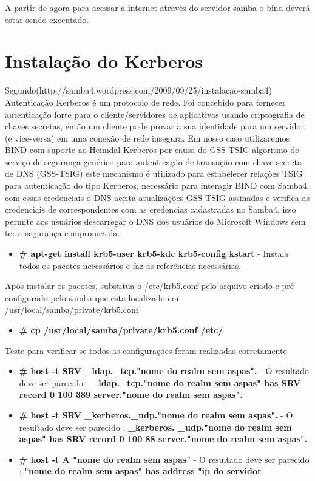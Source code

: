A partir de agora para acessar a internet através do servidor samba o bind deverá estar sendo executado.

\section{Instalação do Kerberos}

Segundo(http://samba4.wordpress.com/2009/09/25/instalacao-samba4) Autenticação Kerberos é um protocolo de rede. Foi concebido para fornecer autenticação forte para o cliente/servidores de aplicativos usando criptografia de chaves secretas, então um cliente pode provar a sua identidade para um servidor (e vice-versa) em uma conexão de rede insegura.
Em nosso caso utilizaremos BIND com suporte ao Heimdal Kerberos por causa do GSS-TSIG algoritmo de serviço de segurança genérico para autenticação de transação com chave secreta de DNS (GSS-TSIG) este mecanismo é utilizado para estabelecer relações TSIG para autenticação do tipo Kerberos, necessário para interagir BIND com Samba4, com essas credenciais o DNS aceita atualizações GSS-TSIG assinadas e verifica as credenciais de correspondentes com as credencias cadastradas no Samba4, isso permite aos usuários descarregar o DNS dos usuários do Microsoft Windows sem ter a segurança comprometida.

\begin{itemize}
	\item \textbf{\# apt-get install krb5-user krb5-kdc krb5-config kstart} - Instala todos os pacotes necessários e faz as referências necessárias.
\end{itemize}

Após instalar os pacotes, substitua o /etc/krb5.conf pelo arquivo criado e pré-configurado pelo samba que esta localizado em /usr/local/samba/private/krb5.conf

\begin{itemize}
	\item \textbf{\# cp /usr/local/samba/private/krb5.conf  /etc/}
\end{itemize}

Teste para verificar se todos as configurações foram realizadas corretamente

\begin{itemize}
	\item \textbf{\# host -t SRV \_ldap.\_tcp."nome do realm sem aspas".} - O resultado deve ser parecido : \textbf{\_ldap.\_tcp."nome do realm sem aspas" has SRV record 0 100 389 server."nome do realm sem aspas".}
	\item \textbf{\# host -t SRV \_kerberos.\_udp."nome do realm sem aspas".} - O resultado deve ser parecido : \textbf{\_kerberos. \_udp."nome do realm sem aspas" has SRV record 0 100 88 server."nome do realm sem aspas".}
	\item \textbf{\# host -t A "nome do realm sem aspas"} - O resultado deve ser parecido : \textbf{"nome do realm sem aspas" has address "ip do servidor}
\end{itemize}

